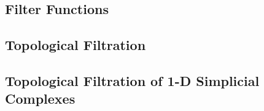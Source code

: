 
\subsection{Filter Functions}

\subsection{Topological Filtration}

\subsection{Topological Filtration of 1-D Simplicial Complexes}

\iffalse


